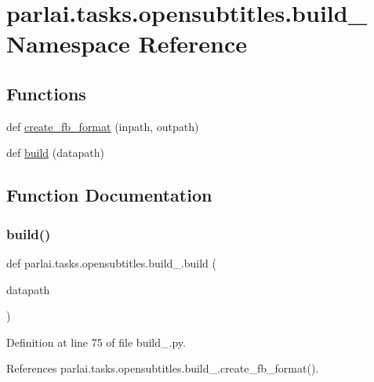 \hypertarget{namespaceparlai_1_1tasks_1_1opensubtitles_1_1build__2009}{}\section{parlai.\+tasks.\+opensubtitles.\+build\+\_ Namespace Reference}
\label{namespaceparlai_1_1tasks_1_1opensubtitles_1_1build__2009}
\subsection*{Functions}
\begin{DoxyCompactItemize}
\item 
def \hyperlink{namespaceparlai_1_1tasks_1_1opensubtitles_1_1build__2009_ad149abe80311061e9b055102702633ed}{create\+\_\+fb\+\_\+format} (inpath, outpath)
\item 
def \hyperlink{namespaceparlai_1_1tasks_1_1opensubtitles_1_1build__2009_a1b4aedcfe5cf20f4708277aba234e048}{build} (datapath)
\end{DoxyCompactItemize}


\subsection{Function Documentation}
\mbox{\label{namespaceparlai_1_1tasks_1_1opensubtitles_1_1build__2009_a1b4aedcfe5cf20f4708277aba234e048}} 
\subsubsection{\texorpdfstring{build()}{build()}}
{\footnotesize\ttfamily def parlai.\+tasks.\+opensubtitles.\+build\+\_.\+build (\begin{DoxyParamCaption}\item[{}]{datapath }\end{DoxyParamCaption})}



Definition at line 75 of file build\+\_.\+py.



References parlai.\+tasks.\+opensubtitles.\+build\+\_.\+create\+\_\+fb\+\_\+format().

